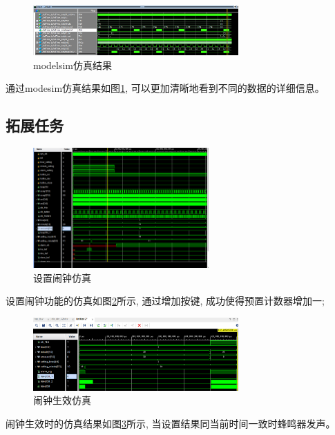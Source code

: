\documentclass{article}
\begin{document}
\begin{figure}[htbp]
    \centering
    \includegraphics[width=0.7\textwidth]{image/2024-06-25-21-26-28.png}
    \caption{modelsim仿真结果}
    \label{image_tellTime_sim_2}
\end{figure}
通过modesim仿真结果如图\ref{image_tellTime_sim_2}, 可以更加清晰地看到不同的数据的详细信息。\\
\subsection*{拓展任务}
\begin{figure}[H]
    \centering
    \includegraphics[width=0.6\textwidth]{image/2024-06-25-21-56-47.png}
    \caption{设置闹钟仿真}
    \label{image_alarm_sim_1}
\end{figure}
设置闹钟功能的仿真如图\ref{image_alarm_sim_1}所示, 通过增加按键, 成功使得预置计数器增加一;\\

\begin{figure}[htbp]
    \centering
    \includegraphics[width=0.7\textwidth]{image/2024-06-25-22-07-02.png}
    \caption{闹钟生效仿真}
    \label{image_alarm_sim_2}
\end{figure}
闹钟生效时的仿真结果如图\ref{image_alarm_sim_2}所示, 当设置结果同当前时间一致时蜂鸣器发声。\\
\end{document}
